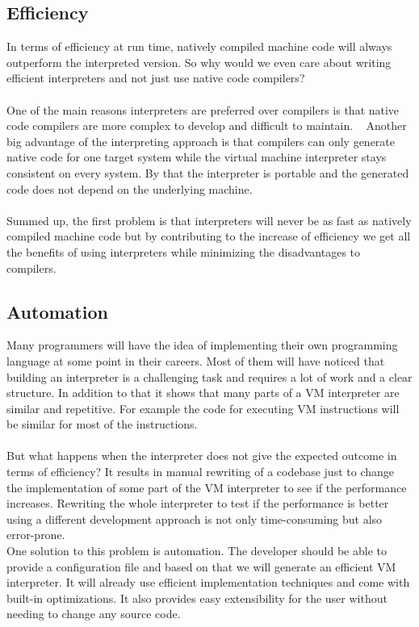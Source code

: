 \documentclass{article}
\begin{document}
\subsection{Efficiency}
In terms of efficiency at run time, natively compiled machine code will always
outperform the interpreted version. So why would we even care about writing
efficient interpreters and not just use native code compilers?
\\ \\
One of the main reasons interpreters are preferred over compilers is that
native code compilers are more complex to develop and difficult to maintain.
~\cite{structure_and_performance} Another big advantage of the interpreting
approach is that compilers can only generate native code for one target system
while the virtual machine interpreter stays consistent on every system. By that
the interpreter is portable and the generated code does not depend on the
underlying machine.
\\ \\
Summed up, the first problem is that interpreters will never be as fast as
natively compiled machine code but by contributing to the increase of efficiency
we get all the benefits of using interpreters while minimizing the
disadvantages to compilers.

\subsection{Automation}
Many programmers will have the idea of implementing their own programming
language at some point in their careers. Most of them will have noticed that
building an interpreter is a challenging task and requires a lot of work and a
clear structure. In addition to that it shows that many parts of a VM
interpreter are similar and repetitive. For example the code for executing VM
instructions will be similar for most of the instructions. ~\cite{vmgen}
\\ \\
But what happens when the interpreter does not give the expected outcome in
terms of efficiency? It results in manual rewriting of a codebase just to
change the implementation of some part of the VM interpreter to see if the
performance increases. Rewriting the whole interpreter to test if the
performance is better using a different development approach is not only
time-consuming but also error-prone.
\\
One solution to this problem is automation. The developer should be able to
provide a configuration file and based on that we will generate an efficient VM
interpreter. It will already use efficient implementation techniques and come
with built-in optimizations. It also provides easy extensibility for the user
without needing to change any source code.
\end{document}
